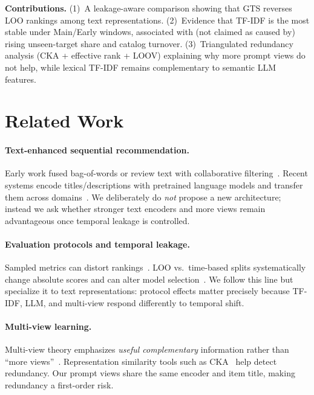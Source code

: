 \documentclass[sigconf,natbib=true,anonymous]{acmart}
\newcommand{\tfidf}{\textsc{TF-IDF}\xspace}
\newcommand{\llm}{\textsc{LLM}\xspace}
\begin{document}
\noindent\textbf{Contributions.}
(1)~A leakage-aware comparison showing that GTS reverses LOO rankings among text representations.
(2)~Evidence that \tfidf is the most stable under Main/Early windows, associated with (not claimed as caused by) rising unseen-target share and catalog turnover.
(3)~Triangulated redundancy analysis (CKA + effective rank + LOOV) explaining why more prompt views do not help, while lexical \tfidf remains complementary to semantic \llm features.

\section{Related Work}

\paragraph{Text-enhanced sequential recommendation.}
Early work fused bag-of-words or review text with collaborative filtering~\cite{wang2015cdl,salton1988termweighting}.
Recent systems encode titles/descriptions with pretrained language models and transfer them across domains~\cite{hou2022unisrec,hou2023vqrec,geng2022p5,bao2023tallrec}.
We deliberately do \emph{not} propose a new architecture; instead we ask whether stronger text encoders and more views remain advantageous once temporal leakage is controlled.

\paragraph{Evaluation protocols and temporal leakage.}
Sampled metrics can distort rankings~\cite{krichene2020sampledmetrics}.
LOO vs.\ time-based splits systematically change absolute scores and can alter model selection~\cite{ji2023evaluation,sun2023reevaluation,meng2020temporal}.
We follow this line but specialize it to text representations: protocol effects matter precisely because \tfidf, \llm, and multi-view respond differently to temporal shift.

\paragraph{Multi-view learning.}
Multi-view theory emphasizes \emph{useful complementary} information rather than ``more views''~\cite{xu2013multiview}.
Representation similarity tools such as CKA~\cite{kornblith2019cka} help detect redundancy.
Our prompt views share the same encoder and item title, making redundancy a first-order risk.
\end{document}
